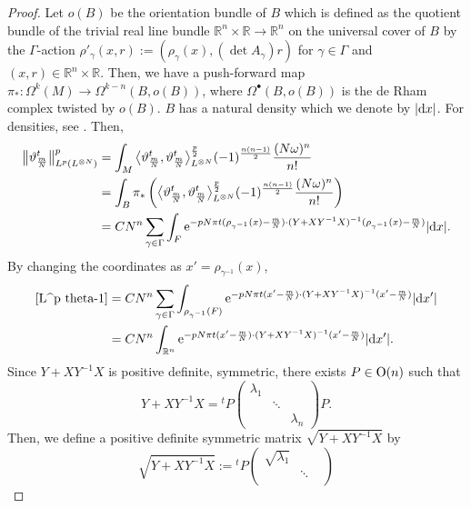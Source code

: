 \documentclass[pdftex]{sigma}
\numberwithin{equation}{section}
\newcommand{\R}{\mathbb{R}}
\newcommand{\abs}[1]{\lvert#1\rvert}
\begin{document}
\begin{proof}
Let $o(B)$ be the orientation bundle of $B$ which is defined as the quotient bundle of the trivial real line bundle $\R^n\times \R \to \R^n$ on the universal cover of $B$ by the $\Gamma$-action $\rho'_\gamma (x,r):=\left(\rho_\gamma (x), (\det A_\gamma) r\right)$ for $\gamma \in \Gamma$ and $(x,r)\in \R^n\times \R$. Then, we have a push-forward map~${\pi_*\colon \Omega^k(M)\to \Omega^{k-n}(B,o(B))}$, where $\Omega^\bullet (B,o(B))$ is the de Rham complex twisted by $o(B)$. $B$ has a natural density which we denote by $\abs{{\rm d}x}$. For densities, see \cite[Chapter I, Section~7]{BT}. Then,
\begin{align}
\big\|\vartheta^t_{\frac{m}{N}}\big\|_{L^p(L^{\otimes N})}^p&=\int_M\big\langle \vartheta^t_{\frac{m}{N}}, \vartheta^t_{\frac{m}{N}}\big\rangle_{L^{\otimes N}}^{\frac{p}{2}} (-1)^{\frac{n(n-1)}{2}}\dfrac{(N\omega)^n}{n!}\nonumber \\
&=\int_B\pi_*\left(\big\langle \vartheta^t_{\frac{m}{N}}, \vartheta^t_{\frac{m}{N}}\big\rangle_{L^{\otimes N}}^{\frac{p}{2}} (-1)^{\frac{n(n-1)}{2}}\dfrac{(N\omega)^n}{n!}\right) \nonumber\\
&=CN^n\sum_{\gamma \in \Gamma}\int_F {\rm e}^{-pN\pi t(\rho_{\gamma^{-1}}(x)-\frac{m}{N})\cdot (Y+XY^{-1}X)^{-1}(\rho_{\gamma^{-1}}(x)-\frac{m}{N})}\abs{{\rm d}x}.\label{L^p theta-1}
\end{align}
By changing the coordinates as $x'=\rho_{\gamma^{-1}}(x)$,
\begin{align}
\eqref{L^p theta-1}&=CN^n\sum_{\gamma \in \Gamma}\int_{\rho_{\gamma^{-1}}(F)} {\rm e}^{-pN\pi t(x'-\frac{m}{N} )\cdot (Y+XY^{-1}X)^{-1}(x'-\frac{m}{N} )} \abs{{\rm d}x'}\nonumber\\
&=CN^n\int_{\R^n} {\rm e}^{-pN\pi t(x'-\frac{m}{N} )\cdot (Y+XY^{-1}X)^{-1}(x'-\frac{m}{N} )} \abs{{\rm d}x'}.\label{L^p theta-2}
\end{align}
Since $Y+XY^{-1}X$ is positive definite, symmetric, there exists $P\in {\rm O}(n)$ such that
\[
Y+XY^{-1}X={}^tP
\begin{pmatrix}
\lambda_1 & & \\
& \ddots & \\
 & & \lambda_n
\end{pmatrix}P.
\]
Then, we define a positive definite symmetric matrix $\sqrt{Y+XY^{-1}X}$ by
\[%
\sqrt{Y+XY^{-1}X}:={}^tP
\begin{pmatrix}
\sqrt{\lambda_1} & & \\
& \ddots & \\

\end{pmatrix}\]
\end{proof}
\end{document}

